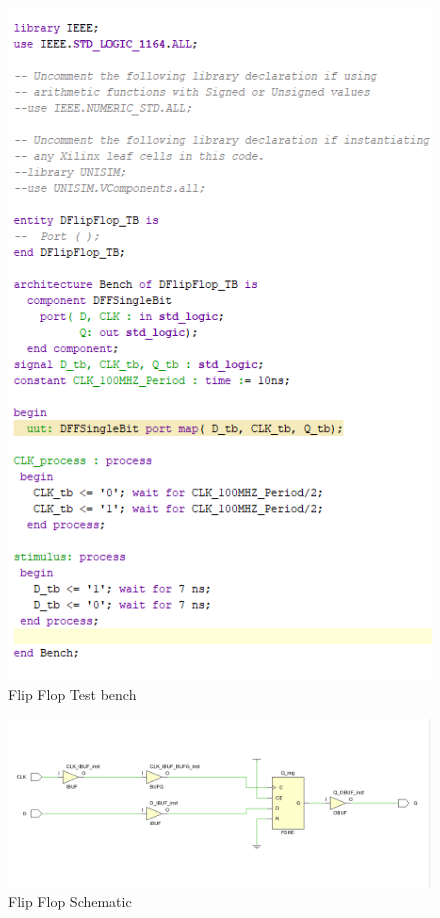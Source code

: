 \documentclass{article}
\begin{document}
\begin{figure}[h]
\begin{center}
\includegraphics[width=1\textwidth]{FlipFlopSimSource.png} %
\caption{Flip Flop Test bench}
\end{center}
\end{figure}

\begin{figure}[h]
\begin{center}
\includegraphics[width=1\textwidth]{FlipFlopSchematic.png} %
\caption{Flip Flop Schematic}
\end{center}
\end{figure}
\end{document}
